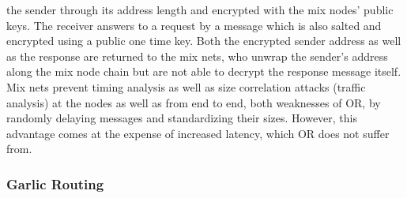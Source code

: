 \documentclass{sig-alternate}
\begin{document}
the sender through its address length and encrypted with the mix nodes' public keys. The receiver answers to a request by a message which is also salted and encrypted using a public one time key. Both the encrypted sender address as well as the response are returned to the mix nets, who unwrap the sender's address along the mix node chain but are not able to decrypt the response message itself. Mix nets prevent timing analysis as well as size correlation attacks (traffic analysis) at the nodes as well as from end to end, both weaknesses of OR, by randomly delaying messages and standardizing their sizes. However, this advantage comes at the expense of increased latency, which OR does not suffer from. 

\subsubsection {Garlic Routing}
\end{document}

